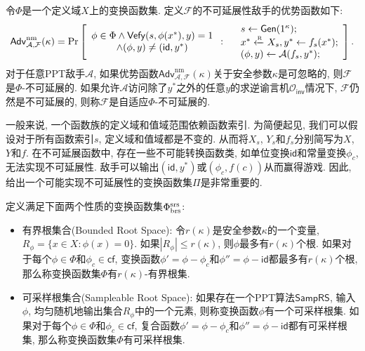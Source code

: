 \begin{definition}[不可延展性和自适应不可延展性]\label{def:NM}
令$\Phi$是一个定义域$X$上的变换函数集. 定义$\mathcal{F}$的不可延展性敌手的优势函数如下:
\begin{displaymath}
	\mathsf{Adv}_{\mathcal{A}, \mathcal{F}}^{\text{nm}}(\kappa) =
		\Pr \left[
		\begin{array}{c}
			\phi \in \Phi \wedge \mathsf{Vefy}(s, \phi(x^*), y)=1 \\
			\wedge (\phi, y) \neq (\mathsf{id}, y^*)
		\end{array} :
		\begin{array}{ll}
         		& s \leftarrow \mathsf{Gen}(1^\kappa);\\
			& x^* \xleftarrow{\textup{\tiny R}} X_s, y^* \leftarrow f_s(x^*);\\
			& (\phi, y) \leftarrow \mathcal{A}(f_s, y^*);
		\end{array} 
		\right].
\end{displaymath}
对于任意PPT敌手$\mathcal{A}$, 如果优势函数$\mathsf{Adv}_{\mathcal{A}, \mathcal{F}}^{\text{nm}}(\kappa)$关于安全参数$\kappa$是可忽略的, 则$\mathcal{F}$是$\Phi$-不可延展的. 如果允许$\mathcal{A}$访问除了$y^*$之外的任意$y$的求逆谕言机$\mathcal{O}_\mathsf{inv}$情况下, $\mathcal{F}$仍然是不可延展的, 则称$\mathcal{F}$是自适应$\Phi$-不可延展的.     
\end{definition}

\begin{note}
一般来说, 一个函数族的定义域和值域范围依赖函数索引. 为简便起见, 我们可以假设对于所有函数索引$s$, 定义域和值域都是不变的. 从而将$X_s$, $Y_s$和$f_s$分别简写为$X$, $Y$和$f$. 在不可延展函数中, 存在一些不可能转换函数类, 如单位变换$\mathsf{id}$和常量变换$\phi_c$, 无法实现不可延展性. 敌手可以输出$(\mathsf{id}, y^*)$或$(\phi_c, f(c))$从而赢得游戏. 因此, 给出一个可能实现不可延展性的变换函数集$\Pi$是非常重要的.
\end{note}

\begin{definition}[一般变换函数集]
定义满足下面两个性质的变换函数集$\Phi_\textup{brs}^\textup{srs}$: 
\begin{itemize}
\item 有界根集合(Bounded Root Space): 令$r(\kappa)$是安全参数$\kappa$的一个变量, $R_\phi = \{x \in X : \phi(x) = 0\}$. 如果$|R_\phi| \leq r(\kappa)$, 则$\phi$最多有$r(\kappa)$个根. 如果对于每个$\phi \in \Phi$和$\phi_c \in \mathsf{cf}$, 变换函数$\phi' = \phi - \phi_c$和$\phi'' = \phi - \mathsf{id}$都最多有$r(\kappa)$个根, 那么称变换函数集$\Phi$有$r(\kappa)$-有界根集.

\item 可采样根集合(Sampleable Root Space): 如果存在一个PPT算法$\mathsf{SampRS}$, 输入$\phi$, 均匀随机地输出集合$R_\phi$中的一个元素, 则称变换函数$\phi$有一个可采样根集. 如果对于每个$\phi \in \Phi$和$\phi_c \in \mathsf{cf}$, 复合函数$\phi' = \phi - \phi_c$和$\phi'' = \phi - \mathsf{id}$都有可采样根集, 那么称变换函数集$\Phi$有可采样根集.
\end{itemize}
\end{definition}

